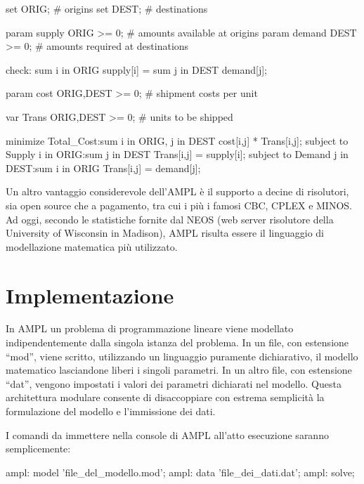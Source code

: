 		\begin{amplcode}
			set ORIG;						# origins
			set DEST;						# destinations

			param supply {ORIG} >= 0;		# amounts available at origins
			param demand {DEST} >= 0;		# amounts required at destinations

			check: sum {i in ORIG} supply[i] = sum {j in DEST} demand[j];
			
			param cost {ORIG,DEST} >= 0;	# shipment costs per unit
			
			var Trans {ORIG,DEST} >= 0;		# units to be shipped

			minimize Total_Cost:sum {i in ORIG, j in DEST} cost[i,j] * Trans[i,j];
			subject to Supply {i in ORIG}:sum {j in DEST} Trans[i,j] = supply[i];
			subject to Demand {j in DEST}:sum {i in ORIG} Trans[i,j] = demand[j];

		\end{amplcode}

		Un altro vantaggio considerevole dell’AMPL è il supporto a decine di risolutori, sia open source che a pagamento, tra cui i più i famosi CBC, CPLEX e MINOS.
		Ad oggi, secondo le statistiche fornite dal NEOS (web server risolutore della University of Wisconsin in Madison), AMPL risulta essere il linguaggio di modellazione matematica più utilizzato.

	\section{Implementazione} %
	\label{sec:implementazione}
		In AMPL un problema di programmazione lineare viene modellato indipendentemente dalla singola istanza del problema. In un file, con estensione “mod”, viene scritto, utilizzando un linguaggio puramente dichiarativo, il modello matematico lasciandone liberi i singoli parametri. In un altro file, con estensione “dat”, vengono impostati i valori dei parametri dichiarati nel modello.
		Questa architettura modulare consente di disaccoppiare con estrema semplicità la formulazione del modello e l’immissione dei dati.

		I comandi da immettere nella console di AMPL all’atto esecuzione saranno semplicemente:	
		\begin{amplcode}
			ampl: model 'file_del_modello.mod';
			ampl: data 'file_dei_dati.dat';
			ampl: solve;
		\end{amplcode}

